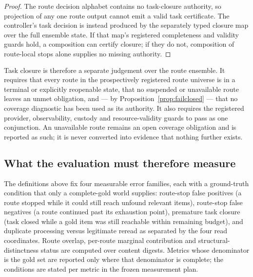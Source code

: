\begin{proof}
The route decision alphabet contains no task-closure authority, so projection
of any one route output cannot emit a valid task certificate. The controller's
task decision is instead produced by the separately typed closure map over the
full ensemble state. If that map's registered completeness and validity guards
hold, a composition can certify closure; if they do not, composition of
route-local stops alone supplies no missing authority.
\end{proof}

Task closure is therefore a separate judgement over the route ensemble. It
requires that every route in the prospectively registered route universe is in
a terminal or explicitly reopenable state, that
no suspended or unavailable route leaves an unmet obligation, and --- by
Proposition~\ref{prop:failclosed} --- that no coverage diagnostic has been used
as its authority. It also requires the registered provider, observability,
custody and resource-validity guards to pass as one conjunction. An unavailable
route remains an open coverage obligation and
is reported as such; it is never converted into evidence that nothing further
exists.

\subsection{What the evaluation must therefore measure}

The definitions above fix four measurable error families, each with a
ground-truth condition that only a complete-gold world supplies: route-stop
false positives (a route stopped while it could still reach unfound relevant
items), route-stop false negatives (a route continued past its exhaustion
point), premature task closure (task closed while a gold item was still
reachable within remaining budget), and duplicate processing versus legitimate
reread as separated by the four read coordinates. Route overlap, per-route
marginal contribution and structural-distinctness status are computed over content
digests. Metrics whose denominator is the gold set are reported only where that
denominator is complete; the conditions are stated per metric in the frozen
measurement plan.
